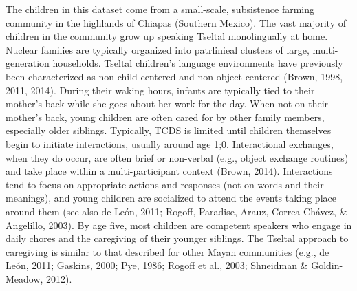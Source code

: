 \documentclass[floatsintext,man]{apa6}
\theoremstyle{definition}
\theoremstyle{definition}
\theoremstyle{definition}
\theoremstyle{remark}
\begin{document}
The children in this dataset come from a small-scale, subsistence
farming community in the highlands of Chiapas (Southern Mexico). The
vast majority of children in the community grow up speaking Tseltal
monolingually at home. Nuclear families are typically organized into
patrlinieal clusters of large, multi-generation households. Tseltal
children's language environments have previously been characterized as
non-child-centered and non-object-centered (Brown, 1998, 2011, 2014).
During their waking hours, infants are typically tied to their mother's
back while she goes about her work for the day. When not on their
mother's back, young children are often cared for by other family
members, especially older siblings. Typically, TCDS is limited until
children themselves begin to initiate interactions, usually around age
1;0. Interactional exchanges, when they do occur, are often brief or
non-verbal (e.g., object exchange routines) and take place within a
multi-participant context (Brown, 2014). Interactions tend to focus on
appropriate actions and responses (not on words and their meanings), and
young children are socialized to attend the events taking place around
them (see also de León, 2011; Rogoff, Paradise, Arauz, Correa-Chávez, \&
Angelillo, 2003). By age five, most children are competent speakers who
engage in daily chores and the caregiving of their younger siblings. The
Tseltal approach to caregiving is similar to that described for other
Mayan communities (e.g., de León, 2011; Gaskins, 2000; Pye, 1986; Rogoff
et al., 2003; Shneidman \& Goldin-Meadow, 2012).
\end{document}
